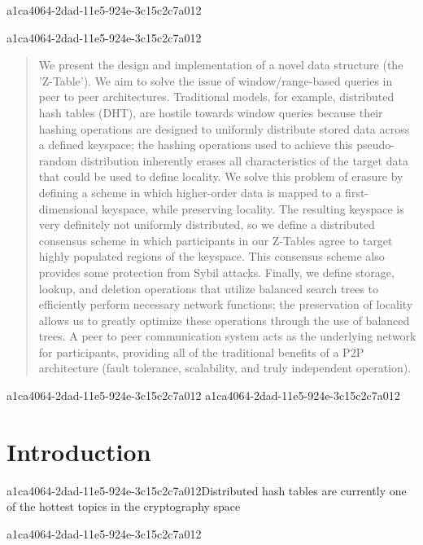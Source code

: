\documentclass[12pt]{article}
\begin{document}
a1ca4064-2dad-11e5-924e-3c15c2c7a012\maketitle

a1ca4064-2dad-11e5-924e-3c15c2c7a012\begin{abstract}
We present the design and implementation of a novel data structure (the 'Z-Table'). We aim to solve the issue of window/range-based queries in peer to peer architectures. Traditional models, for example,  distributed hash tables (DHT), are hostile towards window queries because their hashing operations are designed to uniformly distribute stored data across a defined keyspace; the hashing operations used to achieve this pseudo-random distribution inherently erases all characteristics of the target data that could be used to define locality. We solve this problem of erasure by defining a scheme in which higher-order data is mapped to a first-dimensional keyspace, while preserving locality. The resulting keyspace is very definitely not uniformly distributed, so we define a distributed consensus scheme in which participants in our Z-Tables agree to target highly populated regions of the keyspace. This consensus scheme also provides some protection from Sybil attacks. Finally, we define storage, lookup, and deletion operations that utilize balanced search trees to efficiently perform necessary network functions; the preservation of locality allows us to greatly optimize these operations through the use of balanced trees. A peer to peer communication system acts as the underlying network for participants, providing all of the traditional benefits of a P2P architecture (fault tolerance, scalability, and truly independent operation).
\end{abstract}


a1ca4064-2dad-11e5-924e-3c15c2c7a012\newpage
a1ca4064-2dad-11e5-924e-3c15c2c7a012\section{Introduction}
a1ca4064-2dad-11e5-924e-3c15c2c7a012Distributed hash tables are currently one of the hottest topics in the cryptography space~\cite{Stoica:2001dj,Rowstron:2001ea,Ratnasamy:2001wn}

a1ca4064-2dad-11e5-924e-3c15c2c7a012\printbibliography
\end{document}
